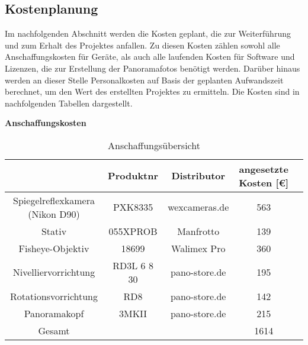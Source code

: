 \subsection{Kostenplanung}
\label{sec:Kostenplanung}

Im nachfolgenden Abschnitt werden die Kosten geplant, die zur Weiterführung und
zum Erhalt des Projektes anfallen. Zu diesen Kosten zählen sowohl alle
Anschaffungskosten für Geräte, als auch alle laufenden Kosten für
Software und Lizenzen, die zur Erstellung der Panoramafotos benötigt werden.
Darüber hinaus werden an dieser Stelle Personalkosten auf Basis der geplanten
Aufwandszeit berechnet, um den Wert des erstellten Projektes zu
ermitteln.
Die Kosten sind in nachfolgenden Tabellen dargestellt. 

\textbf{Anschaffungskosten}

\begin{table}[h]
\centering
\begin{tabular}{ccccl}
\hline
\multicolumn{1}{l}{}            & Produktnr   & Distributor   & angesetzte Kosten {[}€{]}  \\ \hline
Spiegelreflexkamera (Nikon D90) & PXK8335     & wexcameras.de & 563                        \\ \hline
Stativ                          & 055XPROB    & Manfrotto     & 139                        \\ \hline
Fisheye-Objektiv                & 18699       & Walimex Pro   & 360                        \\ \hline
Nivelliervorrichtung            & RD3L 6 8 30 & pano-store.de & 195                        \\ \hline
Rotationsvorrichtung            & RD8         & pano-store.de & 142                        \\ \hline
Panoramakopf                    & 3MKII       & pano-store.de & 215                        \\ \hline

Gesamt                          &             &               & 1614                      \\ \hline
\end{tabular}
\caption{Anschaffungsübersicht}%
\label{tab:KostenaufstellungAnschaffung}%
\end{table}



